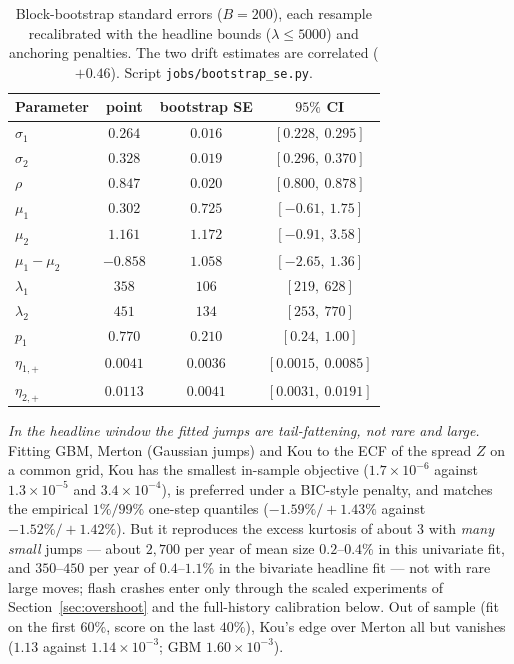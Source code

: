 \documentclass[11pt]{article}
\theoremstyle{plain}
\theoremstyle{definition}
\theoremstyle{remark}
\begin{document}
\begin{table}[ht]
\centering\small
\begin{tabular}{lccc}
\toprule
Parameter & point & bootstrap SE & $95\%$ CI \\
\midrule
$\sigma_1$ & $0.264$ & $0.016$ & $[0.228,\ 0.295]$ \\
$\sigma_2$ & $0.328$ & $0.019$ & $[0.296,\ 0.370]$ \\
$\rho$     & $0.847$ & $0.020$ & $[0.800,\ 0.878]$ \\
$\mu_1$    & $0.302$ & $0.725$ & $[-0.61,\ 1.75]$ \\
$\mu_2$    & $1.161$ & $1.172$ & $[-0.91,\ 3.58]$ \\
$\mu_1-\mu_2$ & $-0.858$ & $1.058$ & $[-2.65,\ 1.36]$ \\
$\lambda_1$ & $358$ & $106$ & $[219,\ 628]$ \\
$\lambda_2$ & $451$ & $134$ & $[253,\ 770]$ \\
$p_1$      & $0.770$ & $0.210$ & $[0.24,\ 1.00]$ \\
$\eta_{1,+}$ & $0.0041$ & $0.0036$ & $[0.0015,\ 0.0085]$ \\
$\eta_{2,+}$ & $0.0113$ & $0.0041$ & $[0.0031,\ 0.0191]$ \\
\bottomrule
\end{tabular}
\caption{Block-bootstrap standard errors ($B=200$), each resample recalibrated with the headline
bounds ($\lambda\le5000$) and anchoring penalties. The two drift estimates are correlated ($+0.46$).
Script \texttt{jobs/bootstrap\_se.py}.}
\label{tab:bootstrap}
\end{table}

\emph{In the headline window the fitted jumps are tail-fattening, not rare and large.} Fitting GBM,
Merton (Gaussian jumps)
and Kou to the ECF of the spread $Z$ on a common grid, Kou has the smallest in-sample objective
($1.7\times10^{-6}$ against $1.3\times10^{-5}$ and $3.4\times10^{-4}$), is preferred under a
BIC-style penalty, and matches the empirical $1\%/99\%$ one-step quantiles ($-1.59\%/{+}1.43\%$
against $-1.52\%/{+}1.42\%$). But it reproduces the excess kurtosis of about $3$ with \emph{many
small} jumps --- about $2{,}700$ per year of mean size $0.2$--$0.4\%$ in this univariate fit, and
$350$--$450$ per year of $0.4$--$1.1\%$ in the bivariate headline fit --- not with rare large moves; flash
crashes enter only through the scaled experiments of Section~\ref{sec:overshoot} and the
full-history calibration below. Out of sample (fit on the first $60\%$, score on the last $40\%$),
Kou's edge over Merton all but vanishes ($1.13$ against $1.14\times10^{-3}$; GBM
$1.60\times10^{-3}$).
\end{document}

